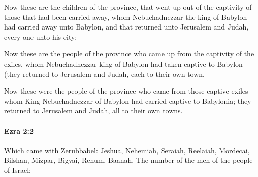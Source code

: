 			\begin{versebox}
					\item[BHS] 
					\item[LXX] 
					\item[ASV] Now these are the children of the province, that went up out of the captivity of those that had been carried away, whom Nebuchadnezzar the king of Babylon had carried away unto Babylon, and that returned unto Jerusalem and Judah, every one unto his city;
					\item[NIV] Now these are the people of the province who came up from the captivity of the exiles, whom Nebuchadnezzar king of Babylon had taken captive to Babylon (they returned to Jerusalem and Judah, each to their own town,
					\item[NRSV] Now these were the people of the province who came from those captive exiles whom King Nebuchadnezzar of Babylon had carried captive to Babylonia; they returned to Jerusalem and Judah, all to their own towns.
			\end{versebox}

		\paragraph{Ezra 2:2} %
			\label{EZRA-2-2}

			Which came with Zerubbabel: Jeshua, Nehemiah, Seraiah, Reelaiah, Mordecai, Bilshan, Mizpar, Bigvai, Rehum, Baanah. The number of the men of the people of Israel:

